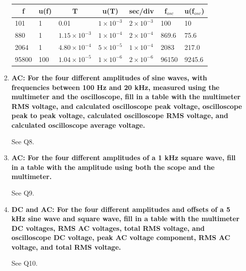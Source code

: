 \begin{enumerate}[resume]
\begin{table}[ht]
\center
\begin{tabular}{|l|l|l|l|l|l|l|}
\hline
\multicolumn{1}{|c|}{f} & \multicolumn{1}{c|}{u(f)} & \multicolumn{1}{c|}{T} & \multicolumn{1}{c|}{u(T)} & \multicolumn{1}{c|}{sec/div} & \multicolumn{1}{c|}{f$_{osc}$} & \multicolumn{1}{c|}{u(f$_{osc}$)} \\ \hline
101                     & 1                         & 0.01                   & $1\times10^{-3}$          & $2\times10^{-3}$             & 100                            & 10                                \\ \hline
880                     & 1                         & $1.15\times10^{-3}$    & $1\times10^{-4}$          & $2\times10^{-4}$             & 869.6                          & 75.6                              \\ \hline
2064                    & 1                         & $4.80\times10^{-4}$    & $5\times10^{-5}$          & $1\times10^{-4}$             & 2083                           & 217.0                             \\ \hline
95800                   & 100                       & $1.04\times10^{-5}$    & $1\times10^{-6}$          & $2\times10^{-6}$             & 96150                          & 9245.6                            \\ \hline
\end{tabular}
\label{tab:accg10}
\end{table}


\item {\bf AC: For the four different amplitudes of sine waves, with frequencies between 100 Hz and 20 kHz, measured using the multimeter and the oscilloscope, fill in a table with the multimeter RMS voltage, and calculated oscilloscope peak voltage, oscilloscope peak to peak voltage, calculated oscilloscope RMS voltage, and calculated oscilloscope average voltage.}\newline

See Q8.

\item {\bf AC: For the four different amplitudes of a 1 kHz square wave, fill in a table with the amplitude using both the scope and the multimeter.}\newline

See Q9.

\item {\bf DC and AC: For the four different amplitudes and offsets of a 5 kHz sine wave and square wave, fill in a table with the multimeter DC voltages, RMS AC voltages, total RMS voltage, and oscilloscope DC voltage, peak AC voltage component, RMS AC voltage, and total RMS voltage.}\newline

See Q10.

\end{enumerate}



